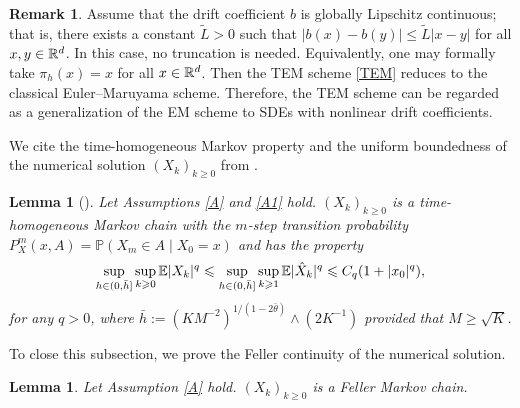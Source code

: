 \documentclass[aap]{imsart}
\theoremstyle{plain}
\newtheorem{lemma}[theorem]{Lemma}
\theoremstyle{definition}
\newtheorem{remark}{Remark}
\begin{document}
\begin{remark}
	Assume that the drift coefficient \(b\) is globally Lipschitz continuous; that is, there exists a constant \(\tilde{L}>0\) such that $|b(x)-b(y)|\leqslant \tilde{L} |x-y|$ for all $x, y\in\mathbb{R}^d$.
	In this case, no truncation is needed. Equivalently, one may formally take
	\(\pi_h(x)=x\) for all \(x\in\mathbb{R}^d\). Then the TEM scheme \eqref{TEM}
	reduces to the classical Euler--Maruyama scheme.
	Therefore, the TEM scheme can be regarded as a generalization of the EM scheme to SDEs with nonlinear drift coefficients.
\end{remark}

We cite the time-homogeneous Markov property and the uniform boundedness of the numerical solution \((X_k)_{k\geqslant0}\) from \cite[p.882, Lemma 7.8; p.869, Theorem 5.5]{IMA}.
	
\begin{lemma}[{\cite[p.882, Lemma 7.8; p.869, Theorem 5.5]{IMA}}]\label{Le2} Let Assumptions \ref{A} and \ref{A1} hold.  
$(X_k)_{k\geqslant 0}$ is a time-homogeneous Markov chain with the $m$-step transition probability $P^m_X(x, A) = \mathbb{P}(X_m\in A \mid X_0 = x)$ and has the property
\begin{equation*}
\sup_{h\in(0, \bar{h}]}\sup_{k\geqslant 0}\mathbb{E} |X_k|^q\leqslant \sup_{h\in(0, \bar{h}]}\sup_{k\geqslant 1}\mathbb{E} |\hat{X}_k|^q\leqslant C_q(1+|x_0|^q), 
\end{equation*}
for any $q>0$, where $\bar{h}:= (KM^{-2})^{1/(1-2\bar{\theta})}\wedge\left(2K^{-1}\right)$ provided that $M\geqslant \sqrt{K}$.
\end{lemma}
	
To close this subsection, we prove the Feller continuity of the numerical solution.
\begin{lemma}\label{Le3} Let Assumption \ref{A} hold.
\((X_k)_{k\geqslant0}\) is a Feller Markov chain.
\end{lemma}	
\end{document}
